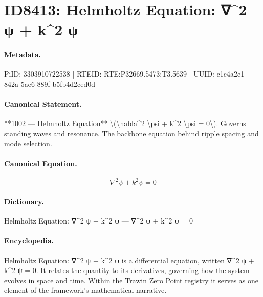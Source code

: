 \section*{ID8413: Helmholtz Equation: ∇\textasciicircum{}2 ψ + k\textasciicircum{}2 ψ}
\paragraph{Metadata.}
PiID: 3303910722538 | RTEID: RTE:P32669.5473:T3.5639 | UUID: c1c4a2e1-842a-5ae6-889f-b5fb4d2ced0d

\paragraph{Canonical Statement.}
**1002 — Helmholtz Equation** \textbackslash{}(\textbackslash{}nabla\textasciicircum{}2 \textbackslash{}psi + k\textasciicircum{}2 \textbackslash{}psi = 0\textbackslash{}). Governs standing waves and resonance. The backbone equation behind ripple spacing and mode selection.

\paragraph{Canonical Equation.}
\[
\nabla^2 \psi + k^2 \psi = 0
\]

\paragraph{Dictionary.}
Helmholtz Equation: ∇\textasciicircum{}2 ψ + k\textasciicircum{}2 ψ — ∇\textasciicircum{}2 ψ + k\textasciicircum{}2 ψ = 0

\paragraph{Encyclopedia.}
Helmholtz Equation: ∇\textasciicircum{}2 ψ + k\textasciicircum{}2 ψ is a differential equation, written ∇\textasciicircum{}2 ψ + k\textasciicircum{}2 ψ = 0. It relates the quantity to its derivatives, governing how the system evolves in space and time. Within the Trawin Zero Point registry it serves as one element of the framework's mathematical narrative.
